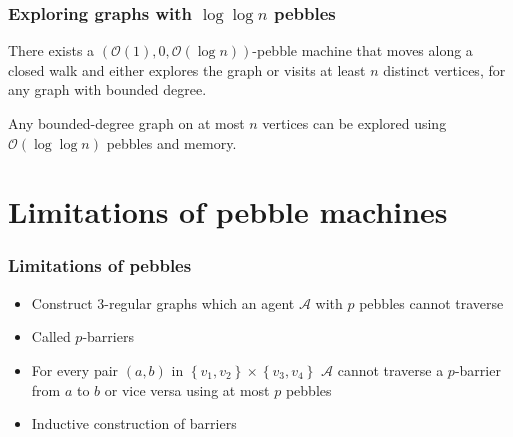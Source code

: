 \documentclass{beamer}
\begin{document}
\begin{frame}
  \frametitle{Exploring graphs with $\log\log n$ pebbles}
  \begin{mdframed}
    \begin{theorem}
      There exists a $(\mathcal{O}(1), 0, \mathcal{O}(\log n))$-pebble machine
      that moves along a closed walk and either explores the graph or visits at
      least $n$ distinct vertices, for any graph with bounded degree.
    \end{theorem}
  \end{mdframed}
  \begin{center}
  \end{center}
  \begin{mdframed}
    \begin{theorem}
      Any bounded-degree graph on at most $n$ vertices can be explored using
      $\mathcal{O}(\log\log n)$ pebbles and memory.
    \end{theorem}
  \end{mdframed}
\end{frame}

\section{Limitations of pebble machines}
\begin{frame}
  \frametitle{Limitations of pebbles}
  \begin{itemize}
    \item Construct $3$-regular graphs which an agent $\mathcal{A}$ with $p$
      pebbles cannot traverse
    \item Called $p$-barriers
      \begin{center}
        \resizebox{0.6\textwidth}{!}{}
      \end{center}
    \item For every pair $(a,b)$ in
      $\left\{v_{1},v_{2}\right\}\times\left\{v_{3},v_{4}\right\}$
      $\mathcal{A}$ cannot traverse a $p$-barrier from $a$ to $b$
      or vice versa using at most $p$ pebbles
    \item Inductive construction of barriers
  \end{itemize}
\end{frame}
\end{document}
